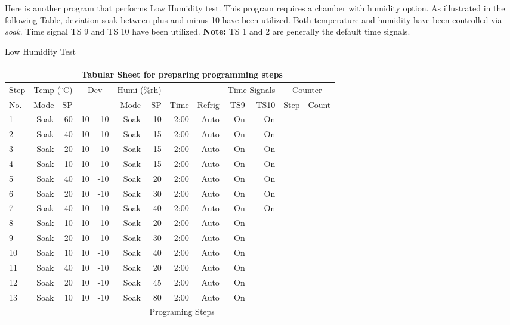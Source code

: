 Here is another program that performs Low Humidity test. This program requires a chamber with humidity option. As illustrated in the following Table, deviation soak between plus and minus 10 have been utilized. Both temperature and humidity have been controlled via {\sl{soak}}. Time signal TS 9 and TS 10 have been utilized. {\bf{Note:}} TS 1 and 2 are generally the default time signals.

\begin{table2}[label={mynamelabel},nameref={Title}]{Low Humidity Test} {\label{tab:sample-prog-01}}
{%
\begin{tabular}{l | r| r| r| r| r| r| r| r| r | r | r |r }
\hline %
\multicolumn{1}{l}{} &  \multicolumn{12}{c}{\bf{Tabular Sheet for preparing programming steps}}          \\
\hline \hline
\multicolumn{1}{l|}{Step} &  \multicolumn{2}{c|}{Temp (${}^{\circ}$C)} & \multicolumn{2}{c|}{Dev} &  \multicolumn{2}{c|}{Humi (\%rh)} &  \multicolumn{2}{c|}{}  &   \multicolumn{2}{c|}{Time Signals}   &   \multicolumn{2}{c}{Counter}    \\
No. & Mode    & SP  & + & -  & Mode   & SP & Time & Refrig & TS9 & TS10 & Step & Count \\
\hline 
1& Soak & 60 & 10 & -10 & Soak & 10  & 2:00&  Auto & On& On & & \\
2& Soak & 40& 10 & -10 & Soak & 15 &  2:00&  Auto & On& On & & \\
3& Soak & 20&  10 & -10 & Soak & 15 &  2:00&  Auto & On& On & & \\
4& Soak & 10& 10 & -10 & Soak & 15 &  2:00&  Auto & On& On & & \\
5& Soak & 40& 10 & -10 & Soak & 20 &   2:00&  Auto & On & On & & \\
6& Soak & 20& 10 & -10 & Soak & 30 &   2:00&  Auto & On& On & & \\
7& Soak & 40& 10 & -10 &  Soak & 40 &   2:00&  Auto & On& On & & \\
8& Soak & 10&  10 & -10 & Soak & 20 &  2:00&  Auto & On&  & & \\
9& Soak & 20&  10 & -10 & Soak & 30 & 2:00&  Auto & On&  & & \\
10& Soak & 10& 10 & -10 & Soak & 40 &   2:00&  Auto & On& & & \\
11& Soak & 40&  10 & -10 & Soak & 20 &  2:00&  Auto & On&  & & \\
12& Soak & 20& 10 & -10 & Soak & 45 &   2:00&  Auto & On&  & & \\
13& Soak & 10&10 & -10 &  Soak & 80 &  2:00&  Auto & On&  & & \\
\hline 
\multicolumn{1}{l}{} &     \multicolumn{12}{c}{Programing Steps} \\
\hline 
\end{tabular} 
}
\end{table2}

